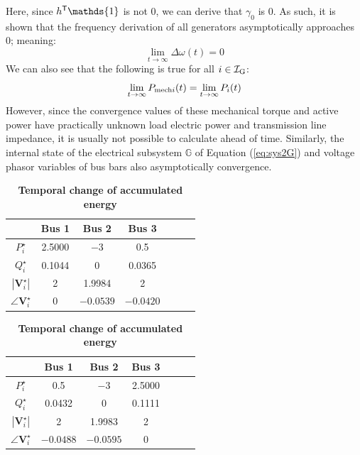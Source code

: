 \documentclass[graybox, envcountchap]{svmult}
\begin{document}
Here, since $h^{\sf T} \mathds{1}$ is not 0, we can derive that $\gamma_0$ is 0.
As such, it is shown that the frequency derivation of all generators asymptotically approaches 0; meaning:
\[
\lim_{t\rightarrow \infty}
\Delta \omega (t) = 0
\]
We can also see that the following is true for all $i\in \mathcal{I}_{\rm G}$:
\[
\lim_{t\rightarrow \infty}
P_{{\rm mech}i}(t) 
=
\lim_{t\rightarrow \infty} P_i (t)
\]
However, since the convergence values of these mechanical torque and active power have practically unknown load electric power and transmission line impedance, it is usually not possible to calculate ahead of time.
Similarly, the internal state of the electrical subsystem $\mathds{G}$ of Equation (\ref{eq:sys2G}) and voltage phasor variables of bus bars also asymptotically convergence.

\begin{table}[h]
\medskip
\caption{\textbf{Temporal change of accumulated energy}} \label{table:pflownl}
 \centering
  {
  \begin{minipage}{0.49\linewidth}
    \centering
  \begin{tabular}{|c|c|c|c|c|c|c|}
   \hline
 &  Bus 1 & Bus 2 & Bus 3 \\
   \hline 
   $P_i^{\star}$ & 2.5000 & $-3$ & 0.5 \\
   \hline
   $Q_i^{\star}$ & 0.1044 & 0 & 0.0365 \\
   \hline
   $|\bm{V}_i^{\star}|$ & 2 & 1.9984 & 2 \\
   \hline
   $\angle \bm{V}_i^{\star}$ & 0 & $-0.0539$ & $-0.0420$ \\
   \hline
  \end{tabular}
  \end{minipage}
  \begin{minipage}{0.49\linewidth}
    \centering
  \begin{tabular}{|c|c|c|c|c|c|c|}
   \hline
 &  Bus 1 & Bus 2 & Bus 3 \\
   \hline 
   $P_i^{\star}$ & 0.5 & $-3$ & 2.5000 \\
   \hline
   $Q_i^{\star}$ & 0.0432 & 0 & 0.1111 \\
   \hline
   $|\bm{V}_i^{\star}|$ & 2 & 1.9983 & 2 \\
   \hline
   $\angle \bm{V}_i^{\star}$ & $-0.0488$ & $-0.0595$ & 0 \\
   \hline
  \end{tabular}
  \end{minipage}
  }
\end{table}
\end{document}
